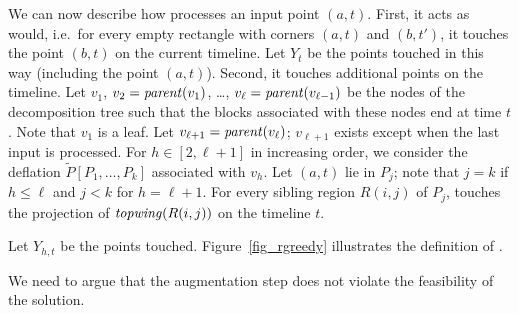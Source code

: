 We can now describe how \agreedy processes an input point $(a,t)$. First, it acts as \greedy would, i.e.\ for every empty rectangle with corners $(a,t)$ and $(b,t')$, it touches the point $(b,t)$ on the current timeline. Let $Y_t$ be the points touched in this way (including the point $(a,t)$). Second, it touches additional points on the timeline. Let $v_1$, $v_2 = \mathit{parent}(v_1)$, \ldots, $v_\ell = \mathit{parent}(v_{\ell - 1})$ be the nodes of the decomposition tree such that the blocks associated with these nodes end at time $t$. Note that $v_1$ is a leaf. Let $v_{\ell +1} = \mathit{parent}(v_\ell)$; $v_{\ell + 1}$ exists except when the last input is processed. For $h \in [2,\ell + 1]$ in increasing order, we consider the deflation $\tilde{P}[P_1,\ldots,P_k]$ associated with $v_h$. Let $(a,t)$ lie in $P_j$; note that $j = k$ if $h \le \ell$ and $j < k$ for $h = \ell + 1$. For every sibling region $R(i,j)$ of $P_j$, \agreedy touches the projection of $\mathit{topwing}(R(i,j))$ on the timeline $t$.

Let $Y_{h,t}$ be the points touched. Figure~\ref{fig_rgreedy} illustrates the definition of \agreedy.








We need to argue that the augmentation step does not violate the feasibility of the solution.


